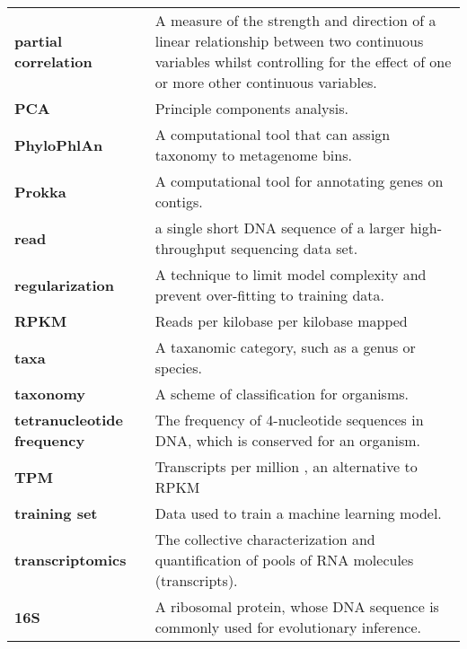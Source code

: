 \begin{singlespace}
\begin{longtable}{ p{}  p{} }
\textbf{partial correlation} & A measure of the strength and direction of a linear relationship between two continuous variables whilst controlling for the effect of one or more other continuous variables. \\
\textbf{PCA} & Principle components analysis. \\
\textbf{PhyloPhlAn} & A computational tool that can assign taxonomy to metagenome bins. \\
\textbf{Prokka} & A computational tool for annotating genes on contigs. \\
\textbf{read} & a single short DNA sequence of a larger high-throughput sequencing data set. \\
\textbf{regularization} & A technique to limit model complexity and prevent over-fitting to training data. \\
\textbf{RPKM} & Reads per kilobase per kilobase mapped \cite{mortazavi2008} \\
\textbf{taxa} & A taxanomic category, such as a genus or species. \\
\textbf{taxonomy} & A scheme of classification for organisms. \\
\textbf{tetranucleotide frequency} & The frequency of 4-nucleotide sequences in DNA, which is conserved for an organism. \\
\textbf{TPM} & Transcripts per million \cite{wagner2012}, an alternative to RPKM \cite{mortazavi2008} \\
\textbf{training set} &  Data used to train a machine learning model. \\
\textbf{transcriptomics} & The collective characterization and quantification of pools of RNA molecules (transcripts). \\
\textbf{16S} & A ribosomal protein, whose DNA sequence is commonly used for evolutionary inference. \\

\end{longtable}
\end{singlespace}

